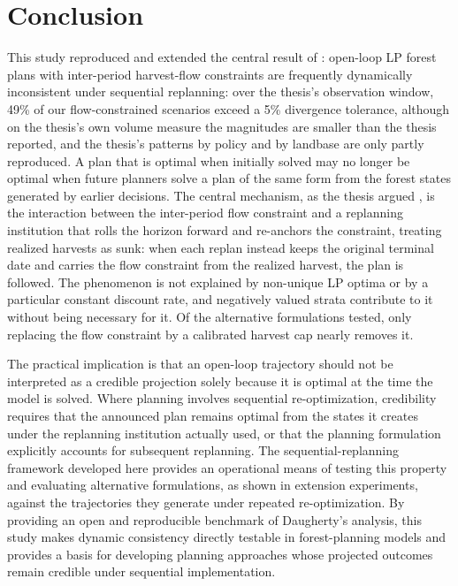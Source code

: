 \section{Conclusion}

This study reproduced and extended the central result of \citet{daugherty1991credibility}: open-loop LP forest plans with inter-period harvest-flow constraints are frequently dynamically inconsistent under sequential replanning: over the thesis's observation window, 49\% of our flow-constrained scenarios exceed a 5\% divergence tolerance, although on the thesis's own volume measure the magnitudes are smaller than the thesis reported, and the thesis's patterns by policy and by landbase are only partly reproduced. A plan that is optimal when initially solved may no longer be optimal when future planners solve a plan of the same form from the forest states generated by earlier decisions. The central mechanism, as the thesis argued \citep[p.~134]{daugherty1991credibility}, is the interaction between the inter-period flow constraint and a replanning institution that rolls the horizon forward and re-anchors the constraint, treating realized harvests as sunk: when each replan instead keeps the original terminal date and carries the flow constraint from the realized harvest, the plan is followed. The phenomenon is not explained by non-unique LP optima or by a particular constant discount rate, and negatively valued strata contribute to it without being necessary for it. Of the alternative formulations tested, only replacing the flow constraint by a calibrated harvest cap nearly removes it.

The practical implication is that an open-loop trajectory should not be interpreted as a credible projection solely because it is optimal at the time the model is solved. Where planning involves sequential re-optimization, credibility requires that the announced plan remains optimal from the states it creates under the replanning institution actually used, or that the planning formulation explicitly accounts for subsequent replanning. The sequential-replanning framework developed here provides an operational means of testing this property and evaluating alternative formulations, as shown in extension experiments, against the trajectories they generate under repeated re-optimization. By providing an open and reproducible benchmark of Daugherty's analysis, this study makes dynamic consistency directly testable in forest-planning models and provides a basis for developing planning approaches whose projected outcomes remain credible under sequential implementation.